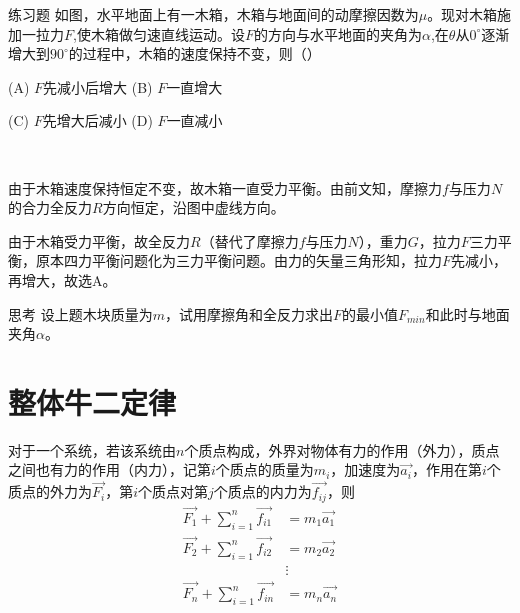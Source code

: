 \begin{ep}{练习题}{}
如图，水平地面上有一木箱，木箱与地面间的动摩擦因数为$\mu$。现对木箱施加一拉力$F$,使木箱做匀速直线运动。设$F$的方向与水平地面的夹角为$\alpha$,在$\theta$从$0^{\circ}$逐渐增大到$90^{\circ}$的过程中，木箱的速度保持不变，则（）


\begin{minipage}[b]{0.6\linewidth}
(A) $F$先减小后增大 \quad (B) $F$一直增大

(C) $F$先增大后减小 \quad (D) $F$一直减小
\end{minipage}
\hfill
\begin{minipage}[b]{0.3\linewidth}

\end{minipage}
~\\

\begin{minipage}[b]{0.6\linewidth}
由于木箱速度保持恒定不变，故木箱一直受力平衡。由前文知，摩擦力$f$与压力$N$的合力全反力$R$方向恒定，沿图中虚线方向。
\end{minipage}
\hfill
\begin{minipage}[b]{0.3\linewidth}

\end{minipage}

由于木箱受力平衡，故全反力$R$（替代了摩擦力$f$与压力$N$），重力$G$，拉力$F$三力平衡，原本四力平衡问题化为三力平衡问题。由力的矢量三角形知，拉力$F$先减小，再增大，故选A。
\end{ep}

\begin{mk}{思考}{}
设上题木块质量为$m$，试用摩擦角和全反力求出$F$的最小值$F_{min}$和此时与地面夹角$\alpha$。
\end{mk}

\section{整体牛二定律}

对于一个系统，若该系统由$n$个质点构成，外界对物体有力的作用（外力），质点之间也有力的作用（内力），记第$i$个质点的质量为$m_i$，加速度为$\vec{a_i}$，作用在第$i$个质点的外力为$\vec{F_i}$，第$i$个质点对第$j$个质点的内力为$\vec{f_{ij}}$，则
\begin{subequations}
\begin{align*}
\vec{F_1} + \sum_{i=1}^{n} \vec{f_{i1}} &= m_1 \vec{a_1} \\
\vec{F_2} + \sum_{i=1}^{n} \vec{f_{i2}} &= m_2 \vec{a_2} \\
&\vdots \\
\vec{F_n} + \sum_{i=1}^{n} \vec{f_{in}} &= m_n \vec{a_n} 
\end{align*}
\end{subequations}

